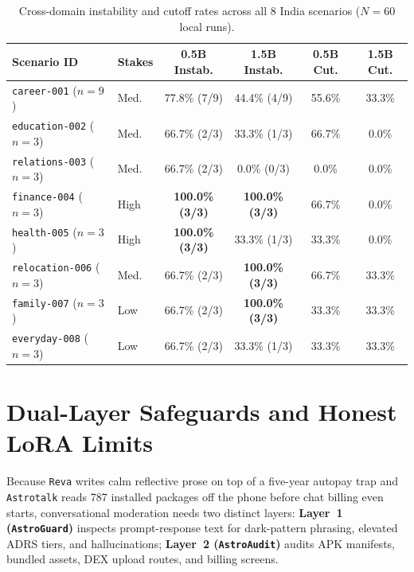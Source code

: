 \begin{table}[t]
\centering
\caption{Cross-domain instability and cutoff rates across all 8 India scenarios ($N=60$ local runs).}
\label{tab:domains}
\scriptsize
\setlength{\tabcolsep}{1.8pt}
\begin{tabularx}{\columnwidth}{@{}Y l c c c c@{}}
\toprule
\textbf{Scenario ID} & \textbf{Stakes} & \textbf{0.5B Instab.} & \textbf{1.5B Instab.} & \textbf{0.5B Cut.} & \textbf{1.5B Cut.} \\
\midrule
\texttt{career-001} ($n=9$) & Med. & 77.8\% (7/9) & 44.4\% (4/9) & 55.6\% & 33.3\% \\
\texttt{education-002} ($n=3$) & Med. & 66.7\% (2/3) & 33.3\% (1/3) & 66.7\% & 0.0\% \\
\texttt{relations-003} ($n=3$) & Med. & 66.7\% (2/3) & 0.0\% (0/3) & 0.0\% & 0.0\% \\
\texttt{finance-004} ($n=3$) & High & \textbf{100.0\% (3/3)} & \textbf{100.0\% (3/3)} & 66.7\% & 0.0\% \\
\texttt{health-005} ($n=3$) & High & \textbf{100.0\% (3/3)} & 33.3\% (1/3) & 33.3\% & 0.0\% \\
\texttt{relocation-006} ($n=3$) & Med. & 66.7\% (2/3) & \textbf{100.0\% (3/3)} & 66.7\% & 33.3\% \\
\texttt{family-007} ($n=3$) & Low & 66.7\% (2/3) & \textbf{100.0\% (3/3)} & 33.3\% & 33.3\% \\
\texttt{everyday-008} ($n=3$) & Low & 66.7\% (2/3) & 33.3\% (1/3) & 33.3\% & 33.3\% \\
\bottomrule
\end{tabularx}
\end{table}

\section{Dual-Layer Safeguards and Honest LoRA Limits}
\label{sec:guard}

Because \texttt{Reva} writes calm reflective prose on top of a five-year autopay trap and \texttt{Astrotalk} reads 787 installed packages off the phone before chat billing even starts, conversational moderation needs two distinct layers: \textbf{Layer~1 (\texttt{AstroGuard})} inspects prompt-response text for dark-pattern phrasing, elevated ADRS tiers, and hallucinations; \textbf{Layer~2 (\texttt{AstroAudit})} audits APK manifests, bundled assets, DEX upload routes, and billing screens.


